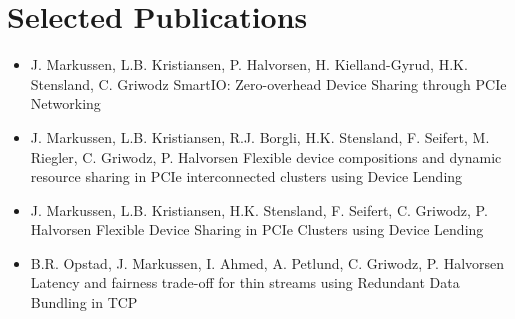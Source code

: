 \section{Selected Publications}
\begin{itemize}
	\item {}
		{J. Markussen, L.B. Kristiansen, P. Halvorsen, H. Kielland-Gyrud, H.K. Stensland, C. Griwodz}
		{SmartIO: Zero-overhead Device Sharing through PCIe Networking}

	\item {}
		{J. Markussen, L.B. Kristiansen, R.J. Borgli, H.K. Stensland, F. Seifert, M. Riegler, C. Griwodz, P. Halvorsen}
		{Flexible device compositions and dynamic resource sharing in PCIe interconnected clusters using Device Lending}
	
	\item {}
		{J. Markussen, L.B. Kristiansen, H.K. Stensland, F. Seifert, C. Griwodz, P. Halvorsen}
		{Flexible Device Sharing in PCIe Clusters using Device Lending}


	\item {}
		{B.R. Opstad, J. Markussen, I. Ahmed, A. Petlund, C. Griwodz, P. Halvorsen}
		{Latency and fairness trade-off for thin streams using Redundant Data Bundling in TCP}
\end{itemize}
